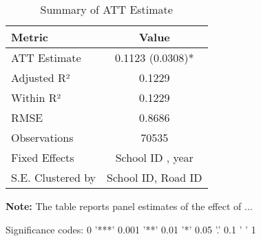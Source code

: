 \begin{table}[H]
\centering
\caption{Summary of ATT Estimate}
\label{tab:SA_reading_100p}
 \begin{center}
 \begin{tabular}{lc}
 \toprule
Metric & Value \\
\midrule
ATT Estimate & 0.1123 (0.0308)* \\
\hline 
 Adjusted R² & 0.1229 \\
Within R² & 0.1229 \\
RMSE & 0.8686 \\
Observations & 70535 \\
\hline 
 Fixed Effects & School ID ,  year \\
S.E. Clustered by & School ID, Road ID \\
\bottomrule
\end{tabular}
 \end{center}\begin{tablenotes}
\small
\item \textbf{Note:} The table reports panel estimates of the effect of ...
\item Significance codes: 0 '***' 0.001 '**' 0.01 '*' 0.05 '.' 0.1 ' ' 1
\end{tablenotes}
\end{table}